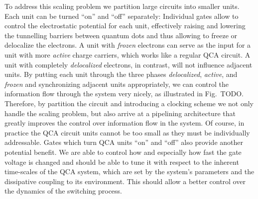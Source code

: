 To address this scaling problem we partition large circuits into smaller units. 
Each unit can be turned ``on'' and ``off'' separately: Individual gates allow to
control the electrostatic potential for each unit, effectively raising and
lowering the tunnelling barriers between quantum dots and thus allowing to
freeze or delocalize the electrons. A unit with \emph{frozen} electrons can
serve as the input for a unit with more \emph{active} charge carriers, which
works like a regular QCA circuit. A unit with completely \emph{delocalized}
electrons, in contrast, will not influence adjacent units. By putting each unit
through the three phases \emph{delocalized}, \emph{active}, and \emph{frozen}
and synchronizing adjacent units appropriately, we can control the
information flow through the system very nicely, as illustrated in Fig.~TODO.
Therefore, by partition the circuit and introducing a clocking scheme we not
only handle the scaling problem, but also arrive at a pipelining architecture
that greatly improves the control over information flow in the system. Of
course, in practice the QCA circuit units cannot be too small as they must be
individually addressable. Gates which turn QCA units ``on'' and ``off'' also
provide another potential benefit. We are able to control how
and especially how fast the gate voltage is changed and should be able to tune
it with respect to the inherent time-scales of the QCA system, which are set by
the system's parameters and the dissipative coupling to its environment. This
should allow a better control over the dynamics of the switching process.

